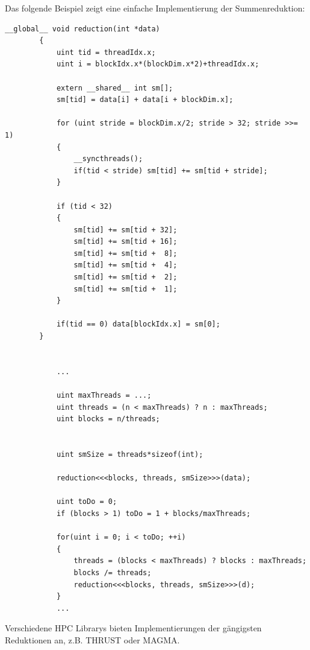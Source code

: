 		Das folgende Beispiel zeigt eine einfache Implementierung der Summenreduktion:
		
		\begin{lstlisting}[caption=Reduktion]		
		__global__ void reduction(int *data)
		{
			uint tid = threadIdx.x;
			uint i = blockIdx.x*(blockDim.x*2)+threadIdx.x;

			extern __shared__ int sm[]; 
			sm[tid] = data[i] + data[i + blockDim.x];
  
			for (uint stride = blockDim.x/2; stride > 32; stride >>= 1)
			{
				__syncthreads();
				if(tid < stride) sm[tid] += sm[tid + stride];
			}
			
			if (tid < 32)
  			{
				sm[tid] += sm[tid + 32];
				sm[tid] += sm[tid + 16];
				sm[tid] += sm[tid +  8];
				sm[tid] += sm[tid +  4];
				sm[tid] += sm[tid +  2];
				sm[tid] += sm[tid +  1];
			}
  
			if(tid == 0) data[blockIdx.x] = sm[0];
		}
		
		
			...
			
			uint maxThreads = ...;
			uint threads = (n < maxThreads) ? n : maxThreads;
			uint blocks = n/threads;
			

			uint smSize = threads*sizeof(int);

			reduction<<<blocks, threads, smSize>>>(data);  

			uint toDo = 0;
			if (blocks > 1) toDo = 1 + blocks/maxThreads;
			
			for(uint i = 0; i < toDo; ++i)
			{
				threads = (blocks < maxThreads) ? blocks : maxThreads;
				blocks /= threads;
				reduction<<<blocks, threads, smSize>>>(d);
			}
			...
		\end{lstlisting}
		
		Verschiedene HPC Librarys bieten Implementierungen der gängigsten Reduktionen an, z.B. THRUST oder MAGMA. 
		

